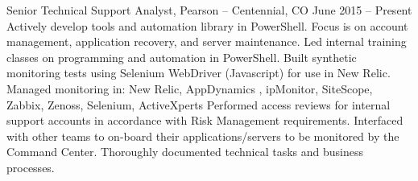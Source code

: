 Senior Technical Support Analyst, Pearson – Centennial, CO
June 2015 – Present
Actively develop tools and automation library in PowerShell. Focus is on account management, application recovery, and server maintenance.
Led internal training classes on programming and automation in PowerShell.
Built synthetic monitoring tests using Selenium WebDriver (Javascript) for use in New Relic.
Managed monitoring in: New Relic, AppDynamics , ipMonitor, SiteScope, Zabbix, Zenoss, Selenium, ActiveXperts
Performed access reviews for internal support accounts in accordance with Risk Management requirements.
Interfaced with other teams to on-board their applications/servers to be monitored by the Command Center.
Thoroughly documented technical tasks and business processes.